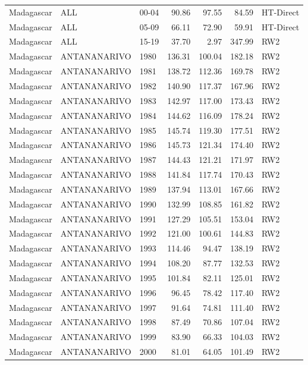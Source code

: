 \begin{longtable}{lllrrrl}
  Madagascar & ALL & 00-04 & 90.86 & 97.55 & 84.59 & HT-Direct \\ 
  Madagascar & ALL & 05-09 & 66.11 & 72.90 & 59.91 & HT-Direct \\ 
  Madagascar & ALL & 15-19 & 37.70 & 2.97 & 347.99 & RW2 \\ 
  Madagascar & ANTANANARIVO & 1980 & 136.31 & 100.04 & 182.18 & RW2 \\ 
  Madagascar & ANTANANARIVO & 1981 & 138.72 & 112.36 & 169.78 & RW2 \\ 
  Madagascar & ANTANANARIVO & 1982 & 140.90 & 117.37 & 167.96 & RW2 \\ 
  Madagascar & ANTANANARIVO & 1983 & 142.97 & 117.00 & 173.43 & RW2 \\ 
  Madagascar & ANTANANARIVO & 1984 & 144.62 & 116.09 & 178.24 & RW2 \\ 
  Madagascar & ANTANANARIVO & 1985 & 145.74 & 119.30 & 177.51 & RW2 \\ 
  Madagascar & ANTANANARIVO & 1986 & 145.73 & 121.34 & 174.40 & RW2 \\ 
  Madagascar & ANTANANARIVO & 1987 & 144.43 & 121.21 & 171.97 & RW2 \\ 
  Madagascar & ANTANANARIVO & 1988 & 141.84 & 117.74 & 170.43 & RW2 \\ 
  Madagascar & ANTANANARIVO & 1989 & 137.94 & 113.01 & 167.66 & RW2 \\ 
  Madagascar & ANTANANARIVO & 1990 & 132.99 & 108.85 & 161.82 & RW2 \\ 
  Madagascar & ANTANANARIVO & 1991 & 127.29 & 105.51 & 153.04 & RW2 \\ 
  Madagascar & ANTANANARIVO & 1992 & 121.00 & 100.61 & 144.83 & RW2 \\ 
  Madagascar & ANTANANARIVO & 1993 & 114.46 & 94.47 & 138.19 & RW2 \\ 
  Madagascar & ANTANANARIVO & 1994 & 108.20 & 87.77 & 132.53 & RW2 \\ 
  Madagascar & ANTANANARIVO & 1995 & 101.84 & 82.11 & 125.01 & RW2 \\ 
  Madagascar & ANTANANARIVO & 1996 & 96.45 & 78.42 & 117.40 & RW2 \\ 
  Madagascar & ANTANANARIVO & 1997 & 91.64 & 74.81 & 111.40 & RW2 \\ 
  Madagascar & ANTANANARIVO & 1998 & 87.49 & 70.86 & 107.04 & RW2 \\ 
  Madagascar & ANTANANARIVO & 1999 & 83.90 & 66.33 & 104.03 & RW2 \\ 
  Madagascar & ANTANANARIVO & 2000 & 81.01 & 64.05 & 101.49 & RW2 \\ 

\end{longtable}
